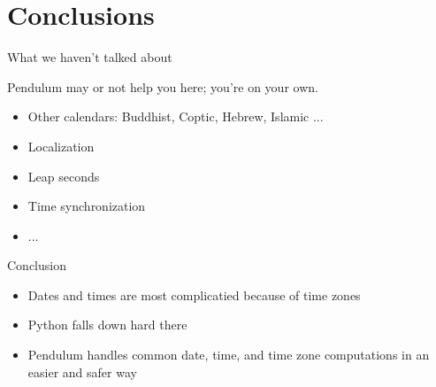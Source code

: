 \documentclass[xcolor=svgnames,17pt]{beamer}
\begin{document}
\section{Conclusions}

\begin{frame}
\tableofcontents[currentsection]
\end{frame}

\begin{frame}{What we haven’t talked about}

Pendulum may or not help you here; you’re on your own.

\pause

\begin{itemize}
\item Other calendars: Buddhist, Coptic, Hebrew, Islamic ...
\item Localization
\item Leap seconds
\item Time synchronization
\item ...
\end{itemize}
\end{frame}

\begin{frame}{Conclusion}
\begin{itemize}
\item Dates and times are most complicatied because of time zones
\item Python falls down hard there
\item Pendulum handles common date, time, and time zone computations in an
easier and safer way
\end{itemize}
\end{frame}
\end{document}
